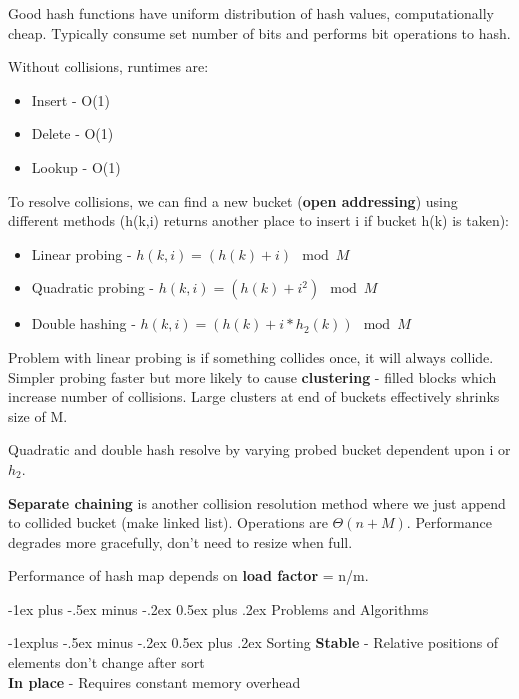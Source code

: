\documentclass[10pt,landscape]{article}
\makeatletter
\renewcommand{\section}{\@startsection{section}{1}{0mm}%
                                {-1ex plus -.5ex minus -.2ex}%
                                {0.5ex plus .2ex}%
                                {\normalfont\large\bfseries}}
\renewcommand{\subsection}{\@startsection{subsection}{2}{0mm}%
                                {-1explus -.5ex minus -.2ex}%
                                {0.5ex plus .2ex}%
                                {\normalfont\normalsize\bfseries}}
\makeatother
\begin{document}
\begin{multicols}{3}
\begin{scriptsize}
Good hash functions have uniform distribution of hash values,
computationally cheap. Typically consume set number of bits and
performs bit operations to hash. 

Without collisions, runtimes are:

\begin{itemize}
\item Insert - O(1)
\item Delete - O(1)
\item Lookup - O(1)
\end{itemize}

To resolve collisions, we can find a new bucket (\textbf{open
addressing}) using different methods (h(k,i) returns another place to
insert i if bucket h(k) is taken):

\begin{itemize}
\item Linear probing - $h(k,i) = (h(k) + i) \mod M$
\item Quadratic probing - $h(k,i) = (h(k) + i^2) \mod M$ 
\item Double hashing -  $h(k,i) = (h(k) + i*h_2(k)) \mod M$
\end{itemize}

Problem with linear probing is if something collides once, it will
always collide. Simpler probing faster but more likely to cause
\textbf{clustering} - filled blocks which increase number of
collisions. Large clusters at end of buckets effectively shrinks size
of M. 

Quadratic and double hash resolve by varying probed
bucket dependent upon i or $h_2$.

\textbf{Separate chaining} is another collision resolution method
where we just append to collided bucket (make linked list). Operations
are $\Theta(n+M)$. Performance degrades more gracefully, don't need to
resize when full.

Performance of hash map depends on \textbf{load factor} = n/m.

\section{Problems and Algorithms}

\subsection{Sorting}
\textbf{Stable} - Relative positions of elements don't change after sort\\
\textbf{In place} - Requires constant memory overhead


\end{scriptsize}
\end{multicols}
\end{document}
